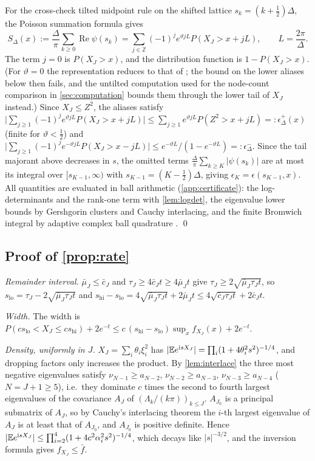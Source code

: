 For the cross-check tilted midpoint rule on the shifted lattice $s_k=(k+\frac12)\Delta$, the Poisson summation formula gives
\[S_\Delta(x):=\frac\Delta\pi\sum_{k\ge0}\operatorname{Re}\psi(s_k)=\sum_{j\in\mathbb Z}(-1)^je^{\vartheta jL}P(X_J>x+jL),\qquad L=\frac{2\pi}\Delta.\]
The term $j=0$ is $P(X_J>x)$, and the distribution function is $1-P(X_J>x)$. (For $\vartheta=0$ the representation
reduces to that of \citet{Dav73}; the bound on the lower aliases below then fails, and the untilted computation used for
the node-count comparison in \cref{sec:computation} bounds them through the lower tail of $X_J$ instead.) Since
$X_J\le Z^2$, the aliases satisfy
$\big|\sum_{j\ge1}(-1)^je^{\vartheta jL}P(X_J>x+jL)\big|\le\sum_{j\ge1}e^{\vartheta jL}P(Z^2>x+jL)=:\epsilon_\Delta^+(x)$
(finite for $\vartheta<\frac12$) and
$\big|\sum_{j\ge1}(-1)^je^{-\vartheta jL}P(X_J>x-jL)\big|\le e^{-\vartheta L}/(1-e^{-\vartheta L})=:\epsilon_\Delta^-$.
Since the tail majorant above decreases in $s$, the omitted terms $\frac\Delta\pi\sum_{k\ge K}|\psi(s_k)|$ are at most
its integral over $[s_{K-1},\infty)$ with $s_{K-1}=(K-\frac12)\Delta$, giving $\epsilon_K=\epsilon(s_{K-1},x)$. All
quantities are evaluated in ball arithmetic (\cref{app:certificate}): the log-determinants and the rank-one term with
\cref{lem:logdet}, the eigenvalue lower bounds by Gershgorin clusters and Cauchy interlacing, and the finite Bromwich
integral by adaptive complex ball quadrature \citep{Joh18}. \qed

\subsection{Proof of \texorpdfstring{\cref{prop:rate}}{the width proposition}}
\emph{Remainder interval.} $\bar\mu_J\le\bar c_J$ and $\tau_J\ge4\bar c_Jt\ge4\bar\mu_Jt$ give $\tau_J\ge2\sqrt{\bar\mu_J\tau_Jt}$,
so $s_{\mathrm{lo}}=\tau_J-2\sqrt{\bar\mu_J\tau_Jt}$ and
$s_{\mathrm{hi}}-s_{\mathrm{lo}}=4\sqrt{\bar\mu_J\tau_Jt}+2\bar\mu_Jt\le4\sqrt{\bar c_J\tau_Jt}+2\bar c_Jt$.

\emph{Width.} The width is $P(cs_{\mathrm{lo}}<X_J\le cs_{\mathrm{hi}})+2e^{-t}\le c\,(s_{\mathrm{hi}}-s_{\mathrm{lo}})\sup_xf_{X_J}(x)+2e^{-t}$.

\emph{Density, uniformly in $J$.} $X_J=\sum_i\theta_i\xi_i^2$ has $|\mathbb E e^{\mathrm isX_J}|=\prod_i(1+4\theta_i^2s^2)^{-1/4}$, and
dropping factors only increases the product. By \cref{lem:interlace} the three most negative eigenvalues satisfy
$\nu_{N-1}\ge a_{N-2}$, $\nu_{N-2}\ge a_{N-3}$, $\nu_{N-3}\ge a_{N-4}$ ($N=J+1\ge5$), i.e.\ they dominate $c$ times the second to fourth largest
eigenvalues of the covariance $A_J$ of $(\Lambda_k/(k\pi))_{k\le J}$. $A_{J_0}$ is a principal submatrix of $A_J$, so by
Cauchy's interlacing theorem the $i$-th largest eigenvalue of $A_J$ is at least that of $A_{J_0}$, and $A_{J_0}$ is
positive definite. Hence $|\mathbb E e^{\mathrm isX_J}|\le\prod_{i=2}^4(1+4c^2\alpha_i^2s^2)^{-1/4}$, which decays like $|s|^{-3/2}$,
and the inversion formula gives $f_{X_J}\le\bar f$.

